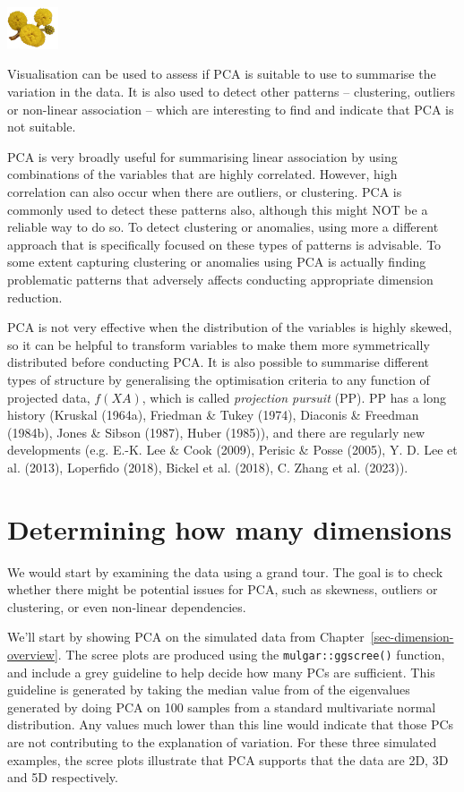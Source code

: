 \documentclass[
  letterpaper,
]{krantz}
\newcommand{\infobox}[1]{%
\noindent\colorbox{info!30}{%
\begin{minipage}{0.98\linewidth}%
    \centering%
    \begin{minipage}[c]{0.15\linewidth} %
      \includegraphics[width=1.5cm]{images/mulga-flowers2.png} %
    \end{minipage}%
    \hfill %
    \begin{minipage}[c]{0.8\linewidth} %
      \bigskip%
      \textsf{#1}%
      \bigskip%
    \end{minipage}%
    \hspace*{3mm}%
  \end{minipage}%
}%
}
\begin{document}
\infobox{Visualisation can be used to assess if PCA is suitable to use to summarise the variation in the data. It is also used to detect other patterns -- clustering, outliers or non-linear association -- which are interesting to find and indicate that PCA is not suitable.}

PCA is very broadly useful for summarising linear association by using
combinations of the variables that are highly correlated. However, high
correlation can also occur when there are outliers, or clustering. PCA
is commonly used to detect these patterns also, although this might NOT
be a reliable way to do so. To detect clustering or anomalies, using
more a different approach that is specifically focused on these types of
patterns is advisable. To some extent capturing clustering or anomalies
using PCA is actually finding problematic patterns that adversely
affects conducting appropriate dimension reduction.

PCA is not very effective when the distribution of the variables is
highly skewed, so it can be helpful to transform variables to make them
more symmetrically distributed before conducting PCA. It is also
possible to summarise different types of structure by generalising the
optimisation criteria to any function of projected data, \(f(XA)\),
which is called \emph{projection pursuit} (PP). PP has a long history
(Kruskal (1964a), Friedman \& Tukey (1974), Diaconis \& Freedman
(1984b), Jones \& Sibson (1987), Huber (1985)), and there are regularly
new developments (e.g. E.-K. Lee \& Cook (2009), Perisic \& Posse
(2005), Y. D. Lee et al. (2013), Loperfido (2018), Bickel et al. (2018),
C. Zhang et al. (2023)).

\section{Determining how many
dimensions}\label{determining-how-many-dimensions}

We would start by examining the data using a grand tour. The goal is to
check whether there might be potential issues for PCA, such as skewness,
outliers or clustering, or even non-linear dependencies.

We'll start by showing PCA on the simulated data from
Chapter~\ref{sec-dimension-overview}. The scree plots are produced using
the \texttt{mulgar::ggscree()} function, and include a grey guideline to
help decide how many PCs are sufficient. This guideline is generated by
taking the median value from of the eigenvalues generated by doing PCA
on 100 samples from a standard multivariate normal distribution. Any
values much lower than this line would indicate that those PCs are not
contributing to the explanation of variation. For these three simulated
examples, the scree plots illustrate that PCA supports that the data are
2D, 3D and 5D respectively.
\end{document}
